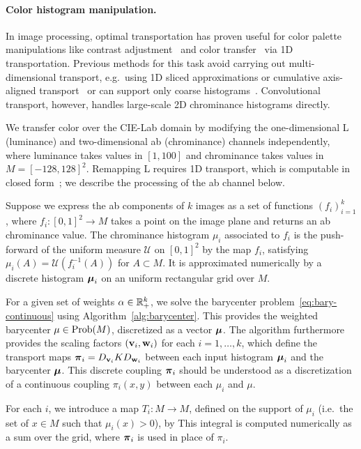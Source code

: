 \vspace{-3mm}
\paragraph*{Color histogram manipulation.}

In image processing, optimal transportation has proven useful for color palette manipulations like contrast adjustment~\cite{Delon:2006} and color transfer~\cite{Pitie07} via 1D transportation.  Previous methods for this task avoid carrying out multi-dimensional transport, e.g.\ using 1D sliced approximations or cumulative axis-aligned transport~\cite{Pitie07,2013-Bonneel-barycenter,Papadakis_ip11} 
or can support only coarse histograms~\cite{2014-ferradans-siims}. Convolutional transport, however, handles large-scale 2D chrominance histograms directly.

We transfer color over the CIE-Lab domain by modifying the one-dimensional L (luminance) and two-dimensional ab (chrominance) channels independently, where luminance takes values in $[1,100]$ and chrominance takes values in $M=[-128,128]^2$. Remapping L requires 1D transport, which is computable in closed form~\cite{villani-2003}; we describe the processing of the ab channel below.

Suppose we express the ab components of $k$ images as a set of functions $(f_i)_{i=1}^k$, where $f_i:[0,1]^2\rightarrow M$ takes a point on the image plane and returns an ab chrominance value.  The chrominance histogram $\mu_i$ associated to $f_i$ is the push-forward of the uniform measure $\mathcal{U}$ on $[0,1]^2$ by the map $f_i$, satisfying $\mu_i(A) = \mathcal{U}(f_i^{-1}(A))$ for $A \subset M$. It is approximated numerically by a discrete histogram $\boldsymbol{\mu}_i$ on an uniform rectangular grid over $M$.

For a given set of weights $\alpha \in \mathbb{R}_+^k$, we solve the barycenter problem~\eqref{eq:bary-continuous} using Algorithm~\ref{alg:barycenter}. This provides the weighted barycenter $\mu \in \mathrm{Prob}(M)$, discretized as a vector $\boldsymbol{\mu}$. The algorithm furthermore provides the scaling factors $(\mathbf v_i,\mathbf w_i)$ for each $i=1,\ldots,k$, which define the transport maps $\boldsymbol{\pi}_i=D_{\mathbf v_i} K D_{\mathbf w_i}$ between each input histogram $\boldsymbol{\mu}_i$ and the barycenter $\boldsymbol{\mu}$. This discrete coupling $\boldsymbol{\pi}_i$ should be understood as a discretization of a continuous coupling $\pi_i(x,y)$ between each $\mu_i$ and $\mu$. 

For each $i$, we introduce a map $T_i : M \rightarrow M$, defined on the support of $\mu_i$ (i.e.\ the set of $x \in M$ such that $\mu_i(x)>0$), by
This integral is computed numerically as a sum over the grid, where $\boldsymbol{\pi}_i$ is used in place of $\pi_i$. 

